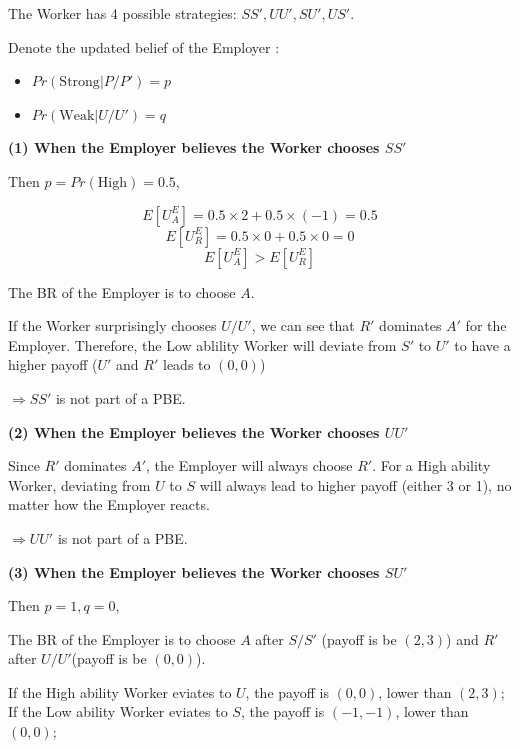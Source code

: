 \documentclass{article}
\begin{document}
\medskip

The Worker has 4 possible strategies: $SS',UU',SU',US'$. 

\smallskip

Denote the updated belief of the Employer :
\begin{itemize}
\item $Pr(\text{Strong} | P/P') = p$
\item $Pr(\text{Weak} | U/U') = q$
\end{itemize}


\textbf{(1) When the Employer believes the Worker chooses $SS'$}

Then $p=Pr(\text{High})=0.5$,

$$E[U^E_{A}] = 0.5 \times 2+ 0.5\times (-1) = 0.5$$
$$E[U^E_{R}] = 0.5 \times 0+ 0.5 \times 0 = 0$$
$$E[U^E_{A}]>E[U^E_{R}]$$

The BR of the Employer is to choose $A$.

\smallskip

If the Worker surprisingly chooses $U/U'$, we can see that $R'$ dominates $A'$
for the Employer. Therefore, the Low ablility Worker will deviate from $S'$ to $U'$
to have a higher payoff ($U'$ and $R'$ leads to $(0,0)$)

\smallskip

$\Rightarrow SS'$ is not part of a PBE.

\medskip

\textbf{(2) When the Employer believes the Worker chooses $UU'$}

\smallskip

Since $R'$ dominates $A'$, the Employer will always choose $R'$. 
For a High ability Worker, deviating from $U$ to $S$ will always lead to
higher payoff (either 3 or 1), no matter how the Employer reacts.

\smallskip

$\Rightarrow UU'$ is not part of a PBE.

\medskip

\textbf{(3) When the Employer believes the Worker chooses $SU'$}

\smallskip

Then $p=1,q=0$,

\smallskip

The BR of the Employer is to choose $A$ after $S/S'$ (payoff is be $(2,3)$) and $R'$ after $U/U'$(payoff is be $(0,0)$).

\smallskip

If the High ability Worker eviates to $U$, the payoff is $(0,0)$, lower than $(2,3)$;
If the Low ability Worker eviates to $S$, the payoff is $(-1,-1)$, lower than $(0,0)$;
\end{document}
